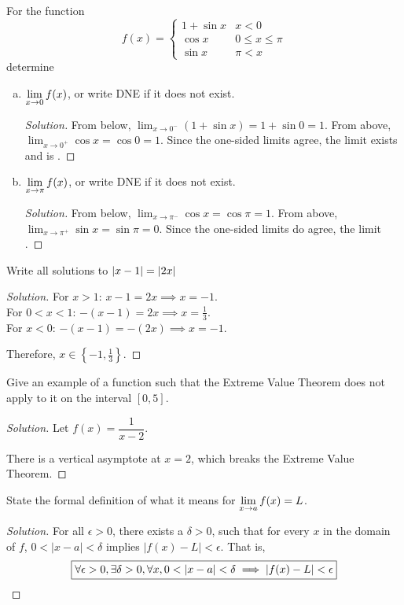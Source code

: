 \question For the function \begin{equation*}
  f(x) = \begin{cases}
    1+\sin x & x < 0             \\
    \cos x   & 0 \leq x \leq \pi \\
    \sin x   & \pi < x
  \end{cases}
\end{equation*} determine
\begin{enumerate}[(a)]
  \item $\displaystyle\lim_{x\to0}f(x)$, or write DNE if it does not exist.
        \begin{proof}[Solution]
          From below, $\lim_{x\to0^-}(1+\sin x)=1+\sin0=1$.
          From above, $\lim_{x\to0^+}\cos x=\cos 0=1$.
          Since the one-sided limits agree, the limit exists and is .
        \end{proof}
  \item $\displaystyle\lim_{x\to\pi}f(x)$, or write DNE if it does not exist.
        \begin{proof}[Solution]
          From below, $\lim_{x\to\pi^-}\cos x=\cos \pi=1$.
          From above, $\lim_{x\to\pi^+}\sin x=\sin \pi=0$.
          Since the one-sided limits do agree, the limit .
        \end{proof}
\end{enumerate}

\question Write all solutions to $\abs{x-1} = \abs{2x}$
\begin{proof}[Solution]
  For $x > 1$: $x-1=2x \implies x=-1$. \\
  For $0 < x < 1$: $-(x-1)=2x \implies x=\frac13$. \\
  For $x < 0$: $-(x-1)=-(2x) \implies x=-1$.

  Therefore, $\boxed{x\in\left\{-1,\frac13\right\}}$.
\end{proof}

\question Give an example of a function such that the Extreme Value Theorem does not apply to it on the interval $[0,5]$.
\begin{proof}[Solution]
  Let $\boxed{f(x) = \dfrac{1}{x-2}}$.

  There is a vertical asymptote at $x=2$, which breaks the Extreme Value Theorem.
\end{proof}

\question State the formal \epsdel{} definition of what it means for $\displaystyle\lim_{x\to a}f(x)=L$.
\begin{proof}[Solution]
  For all $\epsilon > 0$, there exists a $\delta > 0$, such that for every $x$ in the domain of $f$, $0 < |x-a| < \delta$ implies $|f(x)-L| < \epsilon$. That is,
  \[\boxed{\forall\epsilon>0,\exists\delta>0,\forall x,0<|x-a|<\delta\implies|f(x)-L|<\epsilon} \qedhere \]
\end{proof}


